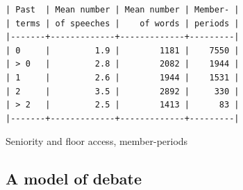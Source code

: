 \documentclass[letter,12pt]{article}
\begin{document}
\begin{table}
  \begin{scriptsize}
    \begin{verbatim}
| Past  | Mean number | Mean number | Member- |
| terms | of speeches |    of words | periods |
|-------+-------------+-------------+---------|
| 0     |         1.9 |        1181 |    7550 |
| > 0   |         2.8 |        2082 |    1944 |
| 1     |         2.6 |        1944 |    1531 |
| 2     |         3.5 |        2892 |     330 |
| > 2   |         2.5 |        1413 |      83 |
|-------+-------------+-------------+---------|
    \end{verbatim}
  \end{scriptsize}
\caption{Seniority and floor access, member-periods}
\end{table}
  
  \subsection{A model of debate}




\end{document}
